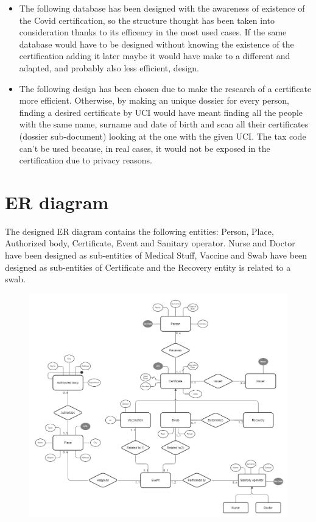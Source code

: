 \documentclass{article}
\begin{document}
\begin{itemize}
\item The following database has been designed with the awareness of existence of the Covid certification, so the structure thought has been taken into consideration thanks to its efficency in the most used cases. If the same database would have to be designed without knowing the existence of the certification adding it later maybe it would have make to a different and adapted, and probably also less efficient, design.
\item The following design has been chosen due to make the research of a certificate more efficient. Otherwise, by making an unique dossier for every person, finding a desired certificate by UCI would have meant finding all the people with the same name, surname and date of birth and scan all their certificates (dossier sub-document) looking at the one with the given UCI. The tax code can't be used because, in real cases, it would not be exposed in the certification due to privacy reasons.

\end{itemize}
\newpage
\section{ER diagram}
The designed ER diagram contains the following entities: Person, Place, Authorized body, Certificate, Event and Sanitary operator. Nurse and Doctor have been designed as sub-entities of Medical Stuff, Vaccine and Swab have been designed as sub-entities of Certificate and the Recovery entity is related to a swab.

\hfill\break
\hfill\break
\hfill\break


\begin{figure}[h!]
\centering
\includegraphics[scale=0.30]{er.png}
\end{figure}
\newpage
\end{document}
